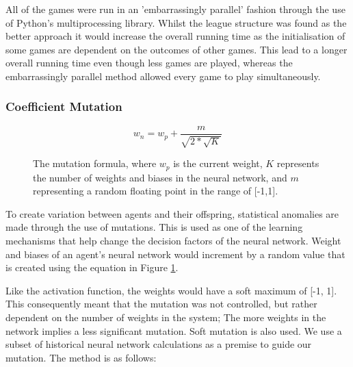 \documentclass[12pt,a4paper]{article}
\begin{document}
            All of the games were run in an 'embarrassingly parallel' fashion through the use of Python's multiprocessing library. Whilst the league structure was found as the better approach \cite{al-khateeb_introducing_2009} it would increase the overall running time as the initialisation of some games are dependent on the outcomes of other games. This lead to a longer overall running time even though less games are played, whereas the embarrassingly parallel method allowed every game to play simultaneously.
            
        \subsubsection{Coefficient Mutation} \label{coefficient_mutation}

            \begin{figure}
            \begin{equation}
                w_n = w_p + \frac{m}{\sqrt{2 * \sqrt{K} }}
            \end{equation}
            \caption{The mutation formula, where $w_p$ is the current weight, $K$ represents the number of weights and biases in the neural network, and $m$ representing a random floating point in the range of [-1,1].\label{mutation}}
            \end{figure}

            To create variation between agents and their offspring, statistical anomalies are made through the use of mutations. This is used as one of the learning mechanisms that help change the decision factors of the neural network. Weight and biases of an agent's neural network would increment by a random value that is created using the equation in Figure \ref{mutation}.

            Like the activation function,
            the weights would have a soft maximum of [-1, 1]. This consequently meant that the mutation was not controlled, but rather dependent on the number of weights in the system; The more weights in the network implies a less significant mutation. Soft mutation \cite{lehman_safe_2017} is also used. We use a subset of historical neural network calculations as a premise to guide our mutation. The method is as follows:
             
\end{document}
